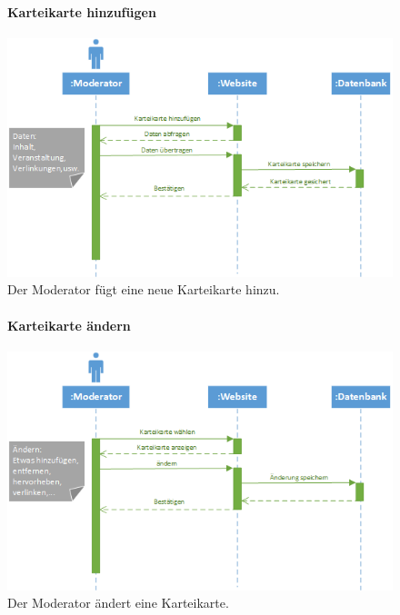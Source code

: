 \documentclass[12pt,a4paper]{article}
\begin{document}
\begin{figure}[H]
	\centering
	\paragraph{Karteikarte hinzufügen}
	\includegraphics[width=\textwidth]{Bilder/Sequenzdiagramme/KarteikarteHinzufuegen.png}
	\caption{Der Moderator fügt eine neue Karteikarte hinzu.}
	\label{SzKarteikarteHinzufuegen}
\end{figure}
\begin{figure}[H]
	\centering
	\paragraph{Karteikarte ändern}
	\includegraphics[width=\textwidth]{Bilder/Sequenzdiagramme/KarteikarteAendern.png}
	\caption{Der Moderator ändert eine Karteikarte.}
	\label{SzKarteikarteAendern}
\end{figure}
\end{document}
